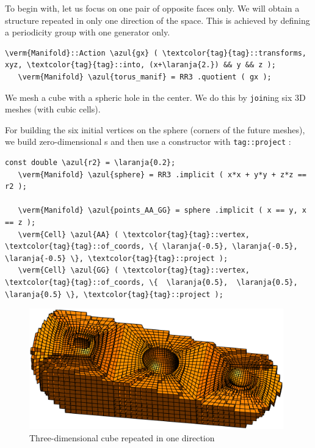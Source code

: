To begin with, let us focus on one pair of opposite faces only.
We will obtain a structure repeated in only one direction of the space.
This is achieved by defining a periodicity group with one generator only.

\begin{Verbatim}[commandchars=\\\{\},formatcom=\small\tt,frame=single,
   label=parag-\ref{\numb section 7.\numb parag 11}.cpp,rulecolor=\color{moldura},
   baselinestretch=0.94,framesep=2mm                                             ]
   \verm{Manifold}::Action \azul{gx} ( \textcolor{tag}{tag}::transforms, xyz, \textcolor{tag}{tag}::into, (x+\laranja{2.}) && y && z );
   \verm{Manifold} \azul{torus_manif} = RR3 .quotient ( gx );
\end{Verbatim}

We mesh a cube with a spheric hole in the center.
We do this by {\small\tt join}ing six 3D meshes (with cubic cells).

For building the six initial vertices on the sphere (corners of the future meshes),
we build zero-dimensional {\small\tt{}}s and then use a
{\small\tt{}} constructor with {\small\tt\textcolor{tag}{tag}::project} :

\begin{Verbatim}[commandchars=\\\{\},formatcom=\small\tt,frame=single,
   label=parag-\ref{\numb section 7.\numb parag 11}.cpp,rulecolor=\color{moldura},
   baselinestretch=0.94,framesep=2mm                                             ]
   const double \azul{r2} = \laranja{0.2};
   \verm{Manifold} \azul{sphere} = RR3 .implicit ( x*x + y*y + z*z == r2 );

   \verm{Manifold} \azul{points_AA_GG} = sphere .implicit ( x == y, x == z );
   \verm{Cell} \azul{AA} ( \textcolor{tag}{tag}::vertex, \textcolor{tag}{tag}::of_coords, \{ \laranja{-0.5}, \laranja{-0.5}, \laranja{-0.5} \}, \textcolor{tag}{tag}::project );
   \verm{Cell} \azul{GG} ( \textcolor{tag}{tag}::vertex, \textcolor{tag}{tag}::of_coords, \{  \laranja{0.5},  \laranja{0.5},  \laranja{0.5} \}, \textcolor{tag}{tag}::project );
\end{Verbatim}

\begin{figure}[ht] \centering
  \includegraphics[width=110mm]{torus-of-cubes-1d.eps}
  \caption{Three-dimensional cube repeated in one direction}
  \label{\numb section 7.\numb fig 7}
\end{figure}

